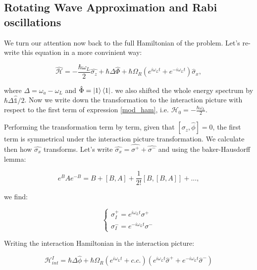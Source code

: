\subsection{Rotating Wave Approximation and Rabi oscillations}

We turn our attention now back to the full Hamiltonian of the problem. Let's re-write this equation in a more convinient way:

\begin{equation} \label{mod_ham}
    \hat{\mathcal{H}} = - \frac {\hbar \omega_{L}}{2} \hat{\sigma_{z}} + \hbar \Delta \hat{\Phi} + \hbar \Omega_{R} (e^{i\omega_{L}t} + e^{-i\omega_{L}t}) \hat{\sigma}_{x},
\end{equation}

where $\Delta = \omega_{a} - \omega_{L}$ and $\hat{\Phi} = \ket{1}\bra{1}$. we also shifted the whole energy spectrum by $\hbar \Delta \hat{\mathbb{1}}/2$. Now we write down the transformation to the interaction picture with respect to the first term of expression \ref{mod_ham}, i.e. $\mathcal{H}_{0} = - \frac {\hbar \omega_{L}}{2}$.

Performing the transformation term by term, given that $[\sigma_{z}, \hat{\phi}] = 0$, the first term is symmetrical under the interaction picture transformation. We calculate then how $\hat{\sigma_{x}}$ transforms. Let's write $\hat{\sigma_{x}} = \hat{\sigma^{+}} + \hat{\sigma^{-}}$ and using the baker-Hausdorff lemma:

\begin{equation}
    e^{B}Ae^{-B} = B + [B,A] + \frac{1}{2!} [B, [B,A]] + ...,
\end{equation}

we find:

\begin{equation}
\begin{cases}
    \sigma^{+}_{I} = e^{ i \omega_{L}t} \sigma^{+} \\
    \sigma^{-}_{I} = e^{ - i \omega_{L}t} \sigma^{-}
\end{cases}
\end{equation}

Writing the interaction Hamiltonian in the interaction picture:

\begin{equation}
    \mathcal{H}_{int}^{I} = \hbar \Delta \hat{\phi} + \hbar\Omega_{R} (e^{i \omega_{L} t} + c.c.) (e^{i \omega_{L} t} \hat{\sigma}^{+} + e^{-i \omega_{L} t}\hat{\sigma}^{-})
\end{equation}

